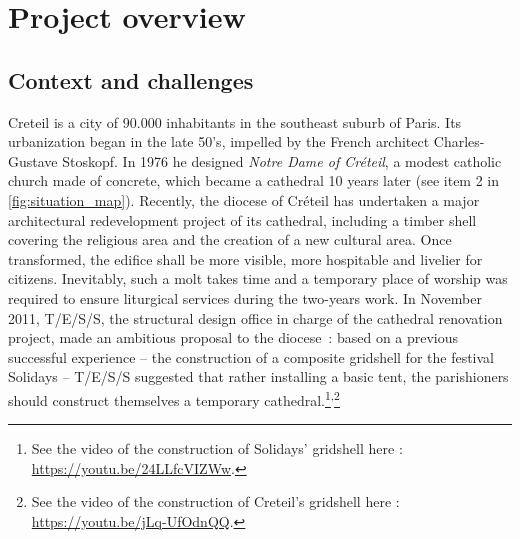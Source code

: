 \section{Project overview}\label{sec=proj_overview}





\subsection{Context and challenges}
Creteil is a city of 90.000 inhabitants in the southeast suburb of Paris. Its urbanization began in the late 50’s, impelled by the French architect Charles-Gustave Stoskopf. In 1976 he designed \emph{Notre Dame of Créteil}, a modest catholic church made of concrete, which became a cathedral 10 years later (see item 2 in \cref{fig:situation_map}). Recently, the diocese of Créteil has undertaken a major architectural redevelopment project of its cathedral, including a timber shell covering the religious area and the creation of a new cultural area. Once transformed, the edifice shall be more visible, more hospitable and livelier for citizens. Inevitably, such a molt takes time and a temporary place of worship was required to ensure liturgical services during the two-years work. In November 2011, T/E/S/S, the structural design office in charge of the cathedral renovation project, made an ambitious proposal to the diocese~: based on a previous successful experience – the construction of a composite gridshell for the festival Solidays \cite{Baverel2012} – T/E/S/S suggested that rather installing a basic tent, the parishioners should construct themselves a temporary cathedral.\footnote{See the video of the construction of Solidays' gridshell here : \url{https://youtu.be/24LLfcVIZWw}.}\textsuperscript{,}\footnote{See the video of the construction of Creteil's gridshell here : \url{https://youtu.be/jLq-UfOdnQQ}.}

